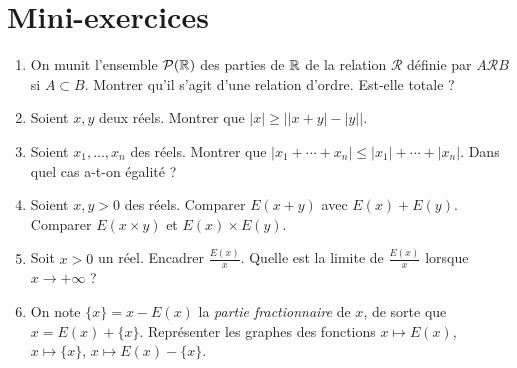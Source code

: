 \section*{Mini-exercices}
\begin{frame}
\begin{miniexercice}
\begin{enumerate}
\item On munit l'ensemble $\mathcal P(\mathbb{R})$ des parties de $\mathbb{R}$ de la relation $\mathcal R$ définie par 
$A\mathcal R B$ si $A\subset B$. Montrer qu'il s'agit d'une relation d'ordre. Est-elle totale ?

\item Soient $x,y$ deux réels. Montrer que $|x|\geq \big||x+y|-|y|\big|$.

\item Soient $x_1,\ldots,x_n$ des réels. Montrer que $|x_1+\cdots+x_n|\leq |x_1|+\cdots+|x_n|$. Dans quel cas a-t-on égalité ?     
        
\item Soient $x,y>0$ des réels. Comparer $E(x+y)$ avec $E(x)+E(y)$. 
Comparer $E(x\times y)$ et $E(x)\times E(y)$.

\item Soit $x>0$ un réel. Encadrer $\frac{E(x)}{x}$. Quelle est la limite de $\frac{E(x)}{x}$ lorsque $x \to +\infty$ ?

\item On note $\{x\}=x-E(x)$ la \emph{partie fractionnaire} de $x$, de sorte que $x=E(x) + \{x\}$.
Représenter les graphes des fonctions $x \mapsto E(x)$, $x \mapsto \{x\}$, $x \mapsto E(x)-\{x\}$.
\end{enumerate}
\end{miniexercice}
\end{frame}





